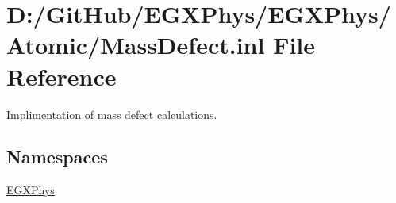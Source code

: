 \hypertarget{_mass_defect_8inl}{}\section{D\+:/\+Git\+Hub/\+E\+G\+X\+Phys/\+E\+G\+X\+Phys/\+Atomic/\+Mass\+Defect.inl File Reference}
\label{_mass_defect_8inl}


Implimentation of mass defect calculations.  


\subsection*{Namespaces}
\begin{DoxyCompactItemize}
\item 
 \mbox{\hyperlink{namespace_e_g_x_phys}{E\+G\+X\+Phys}}
\end{DoxyCompactItemize}
